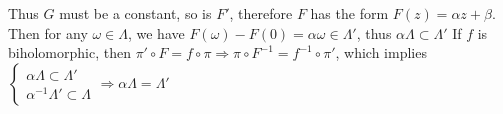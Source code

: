 \documentclass{article}
\begin{document}
\begin{center}
\end{center}

Thus $G$ must be a constant, so is $F'$, therefore $F$ has the form $F(z)=\alpha z+\beta$. Then for any $\omega\in \Lambda$, we have $F(\omega)-F(0)=\alpha\omega\in\Lambda'$, thus $\alpha\Lambda\subset\Lambda'$
If $f$ is biholomorphic, then $\pi'\circ F=f\circ\pi\Rightarrow \pi\circ F^{-1}=f^{-1}\circ\pi'$, which implies $\left\{\begin{array}{rl}
\alpha\Lambda\subset\Lambda' \\
\alpha^{-1}\Lambda'\subset\Lambda
\end{array}\right. \Rightarrow \alpha\Lambda=\Lambda'$

\begin{center}
\end{center}
\end{document}
